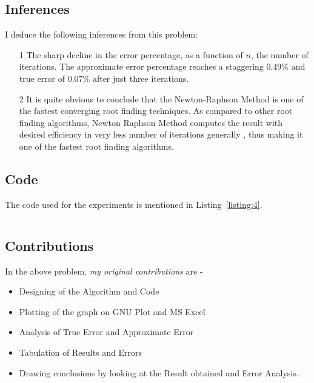 \documentclass[titlepage, 11pt]{article}
\begin{document}

\subsection{Inferences}
I deduce the following inferences from this problem:
\begin{itemize}
    \item [1] The sharp decline in the error percentage, as a function of $n$, the number of iterations. The approximate error percentage reaches a staggering 0.49\% and true error of 0.07\% after just three iterations.
    \item [2] It is quite obvious to conclude that the Newton-Raphson Method is one of the fastest converging root finding techniques. As compared to other root finding algorithms, Newton Raphson Method computes the result with desired efficiency in very less number of iterations generally , thus making it one of the fastest root finding algorithms. 
\end{itemize}


\subsection{Code}
The code used for the experiments is mentioned in Listing~\ref{listing:4}. 

\inputminted[breaklines,
 mathescape,
 linenos,
 numbersep=5pt,
 frame=single,
 numbersep=5pt,
 xleftmargin=0pt]{c}{Newton.c}
\label{listing:4}


\subsection{Contributions}
In the above problem, \textit{my original contributions} are - 
\begin{itemize}
    \item Designing of the Algorithm and Code
    \item Plotting of the graph on GNU Plot and MS Excel
    \item Analysis of True Error and Approximate Error
    \item Tabulation of Results and Errors
    \item Drawing conclusions by looking at the Result obtained and Error Analysis.
\end{itemize}
\end{document}
